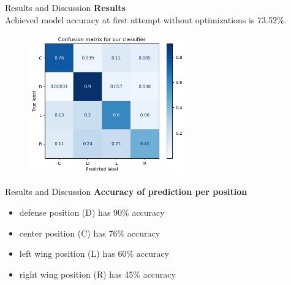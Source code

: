 \begin{frame}{Results and Discussion}
    \textbf{Results}\\
    \vspace{2em}
    Achieved model accuracy at first attempt without optimizations is 73.52\%.
    
    \begin{figure}[H]
        \includegraphics[width=0.6\textwidth]{matrix}
    \end{figure}
\end{frame}

\begin{frame}{Results and Discussion}
    \textbf{Accuracy of prediction per position}\\
    \vspace{2em}
    \begin{itemize}
        \item defense position (D) has 90\% accuracy
        \item center position (C) has 76\% accuracy
        \item left wing position (L) has 60\% accuracy
        \item right wing position (R) has 45\% accuracy
    \end{itemize}
\end{frame}

